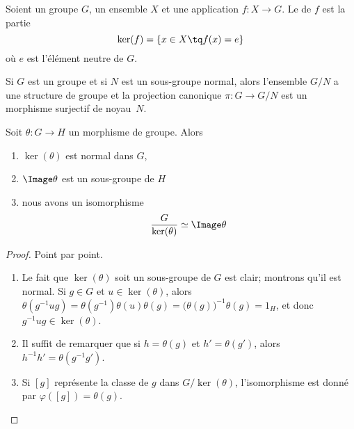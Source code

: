 \begin{definition}      \label{DEFooWBIYooGNRYOp}
	Soient un groupe \( G\), un ensemble \( X\) et une application \( f\colon X\to G\). Le  de \( f\) est la partie
	\begin{equation}
		\ker(f)=\{ x\in X\tq f(x)=e \}
	\end{equation}
	où \( e\) est l'élément neutre de \( G\).
\end{definition}

Si \( G\) est un groupe et si \( N\) est un sous-groupe normal, alors l'ensemble \( G/N\) a une structure de groupe et la projection canonique \( \pi\colon G\to G/N\) est un morphisme surjectif de noyau~\( N\).

\begin{theorem}        \label{ThoPremierthoisomo}
	Soit \( \theta\colon G\to H\) un morphisme de groupe. Alors
	\begin{enumerate}
		\item
		      \( \ker(\theta)\) est normal dans \( G\),
		\item
		      \( \Image \theta\) est un sous-groupe de \( H\)
		\item   \label{ItemWLCLdk}
		      nous avons un isomorphisme
		      \begin{equation}
			      \frac{ G }{ \ker(\theta) }   \simeq \Image\theta
		      \end{equation}
	\end{enumerate}
\end{theorem}

\begin{proof}
	Point par point.
	\begin{enumerate}
		\item
		      Le fait que  \( \ker(\theta)\) soit un sous-groupe de \( G\) est clair; montrons qu'il est normal. Si \( g \in G \) et \( u \in \ker(\theta)\), alors \(\theta (g^{-1} u g) = \theta(g^{-1})\theta(u)\theta(g) = \bigl(\theta(g)\bigr)^{-1}\theta(g) = 1_H \), et donc \( g^{-1} u g \in \ker(\theta)\).
		\item
		      Il suffit de remarquer que si \( h = \theta(g) \) et \( h' = \theta(g') \), alors \( h^{-1} h' = \theta(g^{-1} g') \).
		\item
		      Si \( [g]\) représente la classe de \( g\) dans \( G/\ker(\theta)\), l'isomorphisme est donné par \( \varphi([g])=\theta(g)\).
	\end{enumerate}
\end{proof}

